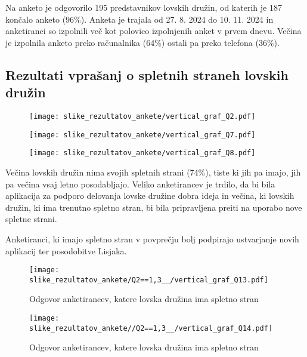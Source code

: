 \documentclass[a4paper,12pt,openright]{book}
\begin{document}
Na anketo je odgovorilo 195 predstavnikov lovskih družin, od katerih je 187 končalo anketo (96\%).
Anketa je trajala od 27. 8. 2024 do 10. 11. 2024 in anketiranci so izpolnili več kot polovico izpolnjenih anket v prvem dnevu.
Večina je izpolnila anketo preko računalnika (64\%) ostali pa preko telefona (36\%).

\subsection{Rezultati vprašanj o spletnih straneh lovskih družin}

\begin{figure}[H]
    \centering
    \texttt{[image: slike\_rezultatov\_ankete/vertical\_graf\_Q2.pdf]}
\end{figure}


\begin{figure}[H]
    \centering
    \texttt{[image: slike\_rezultatov\_ankete/vertical\_graf\_Q7.pdf]}
\end{figure}

\begin{figure}[H]
    \centering
    \texttt{[image: slike\_rezultatov\_ankete/vertical\_graf\_Q8.pdf]}
\end{figure}




Večina lovskih družin nima svojih spletnih strani (74\%), tiste ki jih pa imajo, jih pa večina vsaj letno posodabljajo.
Veliko anketirancev je trdilo, da bi bila aplikacija za podporo delovanja lovske družine dobra ideja in večina, ki lovskih družin, ki ima trenutno spletno stran, bi bila pripravljena preiti na uporabo nove spletne strani.

Anketiranci, ki imajo spletno stran v povprečju bolj podpirajo ustvarjanje novih aplikacij ter posodobitve Lisjaka.

\begin{figure}[H]
    \centering
    \texttt{[image: slike\_rezultatov\_ankete/Q2==1,3\_\_/vertical\_graf\_Q13.pdf]}
    \caption{Odgovor anketirancev, katere lovska družina ima spletno stran}
\end{figure}

\begin{figure}[H]
    \centering
    \texttt{[image: slike\_rezultatov\_ankete//Q2==1,3\_\_/vertical\_graf\_Q14.pdf]}
    \caption{Odgovor anketirancev, katere lovska družina ima spletno stran}
\end{figure}
\end{document}
